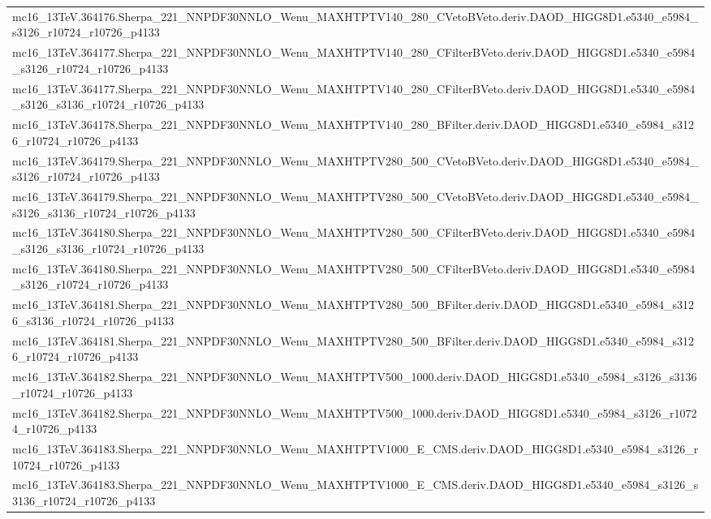 \begin{adjustwidth}{-3em}{-3em}
\begin{longtable}{l}
mc16\_13TeV.364176.Sherpa\_221\_NNPDF30NNLO\_Wenu\_MAXHTPTV140\_280\_CVetoBVeto.deriv.DAOD\_HIGG8D1.e5340\_e5984\_s3126\_r10724\_r10726\_p4133 \\
mc16\_13TeV.364177.Sherpa\_221\_NNPDF30NNLO\_Wenu\_MAXHTPTV140\_280\_CFilterBVeto.deriv.DAOD\_HIGG8D1.e5340\_e5984\_s3126\_r10724\_r10726\_p4133 \\
mc16\_13TeV.364177.Sherpa\_221\_NNPDF30NNLO\_Wenu\_MAXHTPTV140\_280\_CFilterBVeto.deriv.DAOD\_HIGG8D1.e5340\_e5984\_s3126\_s3136\_r10724\_r10726\_p4133 \\
mc16\_13TeV.364178.Sherpa\_221\_NNPDF30NNLO\_Wenu\_MAXHTPTV140\_280\_BFilter.deriv.DAOD\_HIGG8D1.e5340\_e5984\_s3126\_r10724\_r10726\_p4133 \\
mc16\_13TeV.364179.Sherpa\_221\_NNPDF30NNLO\_Wenu\_MAXHTPTV280\_500\_CVetoBVeto.deriv.DAOD\_HIGG8D1.e5340\_e5984\_s3126\_r10724\_r10726\_p4133 \\
mc16\_13TeV.364179.Sherpa\_221\_NNPDF30NNLO\_Wenu\_MAXHTPTV280\_500\_CVetoBVeto.deriv.DAOD\_HIGG8D1.e5340\_e5984\_s3126\_s3136\_r10724\_r10726\_p4133 \\
mc16\_13TeV.364180.Sherpa\_221\_NNPDF30NNLO\_Wenu\_MAXHTPTV280\_500\_CFilterBVeto.deriv.DAOD\_HIGG8D1.e5340\_e5984\_s3126\_s3136\_r10724\_r10726\_p4133 \\
mc16\_13TeV.364180.Sherpa\_221\_NNPDF30NNLO\_Wenu\_MAXHTPTV280\_500\_CFilterBVeto.deriv.DAOD\_HIGG8D1.e5340\_e5984\_s3126\_r10724\_r10726\_p4133 \\
mc16\_13TeV.364181.Sherpa\_221\_NNPDF30NNLO\_Wenu\_MAXHTPTV280\_500\_BFilter.deriv.DAOD\_HIGG8D1.e5340\_e5984\_s3126\_s3136\_r10724\_r10726\_p4133 \\
mc16\_13TeV.364181.Sherpa\_221\_NNPDF30NNLO\_Wenu\_MAXHTPTV280\_500\_BFilter.deriv.DAOD\_HIGG8D1.e5340\_e5984\_s3126\_r10724\_r10726\_p4133 \\
mc16\_13TeV.364182.Sherpa\_221\_NNPDF30NNLO\_Wenu\_MAXHTPTV500\_1000.deriv.DAOD\_HIGG8D1.e5340\_e5984\_s3126\_s3136\_r10724\_r10726\_p4133 \\
mc16\_13TeV.364182.Sherpa\_221\_NNPDF30NNLO\_Wenu\_MAXHTPTV500\_1000.deriv.DAOD\_HIGG8D1.e5340\_e5984\_s3126\_r10724\_r10726\_p4133 \\
mc16\_13TeV.364183.Sherpa\_221\_NNPDF30NNLO\_Wenu\_MAXHTPTV1000\_E\_CMS.deriv.DAOD\_HIGG8D1.e5340\_e5984\_s3126\_r10724\_r10726\_p4133 \\
mc16\_13TeV.364183.Sherpa\_221\_NNPDF30NNLO\_Wenu\_MAXHTPTV1000\_E\_CMS.deriv.DAOD\_HIGG8D1.e5340\_e5984\_s3126\_s3136\_r10724\_r10726\_p4133 \\

\end{longtable}
\end{adjustwidth}
